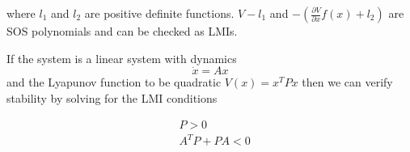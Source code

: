 where $l_1$ and $l_2$ are positive definite functions. $V - l_1$ and $-\left(\frac{\partial V}{\partial x} f(x) + l_2 \right)$ are SOS polynomials and can be checked as LMIs.

If the system is a linear system with dynamics
\begin{equation}
        \dot{x} = Ax
\end{equation}
and the Lyapunov function to be quadratic $V(x) = x^T P x$ then we can verify stability by solving for the LMI conditions

\begin{equation}
        \begin{split}
                &P > 0 \\
                &A^T P + PA < 0
        \end{split}
\end{equation}
